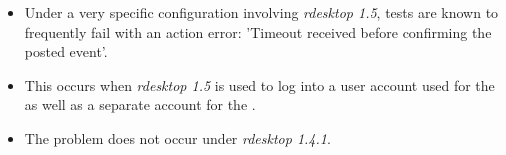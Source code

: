 % 
%
%

\begin{itemize}
\item Under a very specific configuration involving \emph{rdesktop 1.5}, tests are known to frequently fail  with an action error: 'Timeout received before confirming the posted event'. 
\item This occurs when \emph{rdesktop 1.5} is used to log into a user account used for the \ite{} as well as a separate account for the \gdagent{}. 
\item The problem does not occur under \emph{rdesktop 1.4.1}.
\end{itemize}
